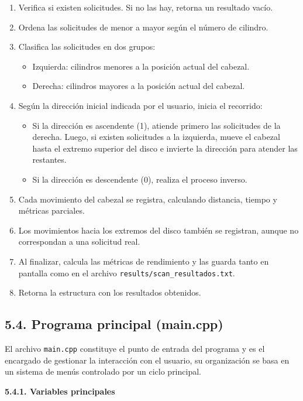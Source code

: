 \documentclass[14pt,letterpaper]{extarticle}
\begin{document}
\begin{enumerate}
    \item Verifica si existen solicitudes. Si no las hay, retorna un resultado vacío.
    \item Ordena las solicitudes de menor a mayor según el número de cilindro.
    \item Clasifica las solicitudes en dos grupos:
    \begin{itemize}
        \item Izquierda: cilindros menores a la posición actual del cabezal.
        \item Derecha: cilindros mayores a la posición actual del cabezal.
    \end{itemize}
    \item Según la dirección inicial indicada por el usuario, inicia el recorrido:
    \begin{itemize}
        \item Si la dirección es ascendente (1), atiende primero las solicitudes de la derecha. Luego, si existen solicitudes a la izquierda, mueve el cabezal hasta el extremo superior del disco e invierte la dirección para atender las restantes.
        \item Si la dirección es descendente (0), realiza el proceso inverso.
    \end{itemize}
    \item Cada movimiento del cabezal se registra, calculando distancia, tiempo y métricas parciales.
    \item Los movimientos hacia los extremos del disco también se registran, aunque no correspondan a una solicitud real.
    \item Al finalizar, calcula las métricas de rendimiento y las guarda tanto en pantalla como en el archivo \texttt{results/scan\_resultados.txt}.
    \item Retorna la estructura con los resultados obtenidos.
\end{enumerate}

\subsection*{5.4. Programa principal (main.cpp)}

El archivo \texttt{main.cpp} constituye el punto de entrada del programa y es el encargado de gestionar la interacción con el usuario, su organización se basa en un sistema de menús controlado por un ciclo principal.

\textbf{5.4.1. Variables principales}
\end{document}
